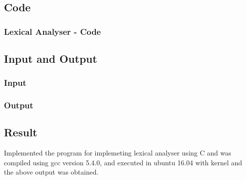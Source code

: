 \subsection{Code}
    \subsubsection*{Lexical Analyser - Code}
        

\subsection{Input and Output}
    \subsubsection{Input}
        
    \subsubsection{Output}
        

\subsection{Result}
Implemented the program for implemeting lexical analyser using C and was compiled using gcc version 5.4.0, and executed in ubuntu 16.04 with kernel and the above output was obtained.